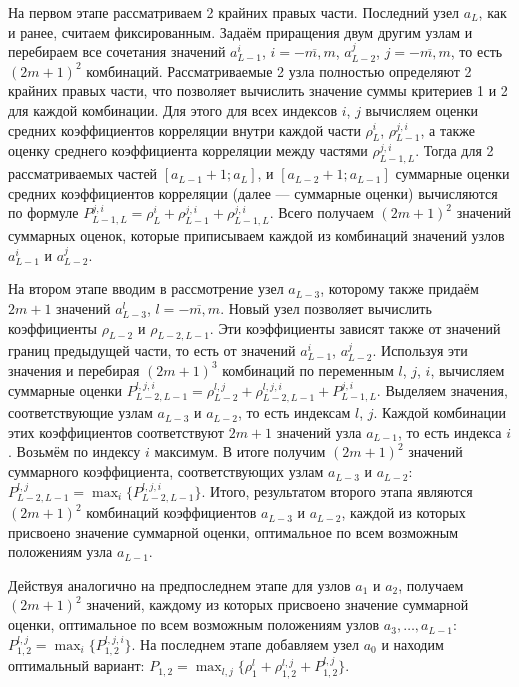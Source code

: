 На первом этапе рассматриваем 2 крайних правых части.
Последний узел $a_L$, как и ранее, считаем фиксированным.
Задаём приращения двум другим узлам и перебираем все сочетания значений $a_{L-1}^i$, $i = \overline{-m, m}$, $a_{L-2}^j$, $j = \overline{-m, m}$, то есть $(2m + 1)^2$ комбинаций.
Рассматриваемые 2 узла полностью определяют 2 крайних правых части, что позволяет вычислить значение суммы критериев 1 и 2 для каждой комбинации.
Для этого для всех индексов $i$, $j$ вычисляем оценки средних коэффициентов корреляции внутри каждой части $\rho_L^i$, $\rho_{L-1}^{j, i}$, а также оценку среднего коэффициента корреляции между частями $\rho_{L-1, L}^{j, i}$.
Тогда для 2 рассматриваемых частей $[a_{L-1} + 1; a_L]$, и $[a_{L-2} + 1; a_{L-1}]$ суммарные оценки средних коэффициентов корреляции (далее --- суммарные оценки) вычисляются по формуле $P_{L-1, L}^{j, i} = \rho_L^i + \rho_{L-1}^{j, i} + \rho_{L-1, L}^{j, i}$.
Всего получаем $(2m + 1)^2$ значений суммарных оценок, которые приписываем каждой из комбинаций значений узлов $a_{L-1}^i$ и $a_{L-2}^j$.

На втором этапе вводим в рассмотрение узел $a_{L-3}$, которому также придаём $2m + 1$ значений $a_{L-3}^l$, $l = \overline{-m, m}$.
Новый узел позволяет вычислить коэффициенты $\rho_{L-2}$ и $\rho_{L-2, L-1}$.
Эти коэффициенты зависят также от значений границ предыдущей части, то есть от значений $a_{L-1}^i$, $a_{L-2}^j$.
Используя эти значения и перебирая $(2m + 1)^3$ комбинаций по переменным $l$, $j$, $i$, вычисляем суммарные оценки $P_{L-2, L-1}^{l, j, i} = \rho_{L-2}^{l, j} + \rho_{L-2, L-1}^{l, j, i} + P_{L-1, L}^{j, i}$.
Выделяем значения, соответствующие узлам $a_{L-3}$ и $a_{L-2}$, то есть индексам $l$, $j$.
Каждой комбинации этих коэффициентов соответствуют $2m + 1$ значений узла $a_{L-1}$, то есть индекса $i$.
Возьмём по индексу $i$ максимум.
В итоге получим $(2m + 1)^2$ значений суммарного коэффициента, соответствующих узлам $a_{L-3}$ и $a_{L-2}$: $P_{L-2, L-1}^{l, j} = \max_{i} \{ P_{L-2, L-1}^{l, j, i} \}$.
Итого, результатом второго этапа являются $(2m + 1)^2$ комбинаций коэффициентов $a_{L-3}$ и $a_{L-2}$, каждой из которых присвоено значение суммарной оценки, оптимальное по всем возможным положениям узла $a_{L-1}$.

Действуя аналогично на предпоследнем этапе для узлов $a_1$ и $a_2$, получаем $(2m + 1)^2$ значений, каждому из которых присвоено значение суммарной оценки, оптимальное по всем возможным положениям узлов $a_3, \dots, a_{L-1}$: $P_{1, 2}^{l, j} = \max_{i} \{ P_{1, 2}^{l, j, i} \}$.
На последнем этапе добавляем узел $a_0$ и находим оптимальный вариант: $P_{1, 2} = \max_{l, j} \{ \rho_1^l + \rho_{1, 2}^{l, j} + P_{1, 2}^{l, j} \}$.

